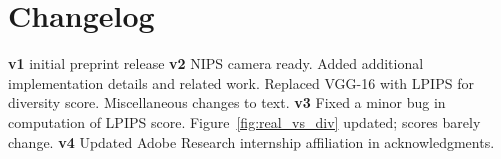 \section*{Changelog}
\small
\textbf{v1} initial preprint release
\textbf{v2} NIPS camera ready. Added additional implementation details and related work. Replaced VGG-16 with LPIPS for diversity score. Miscellaneous changes to text.
\textbf{v3} Fixed a minor bug in computation of LPIPS score. Figure~\ref{fig:real_vs_div} updated; scores barely change.
\textbf{v4} Updated Adobe Research internship affiliation in acknowledgments.
